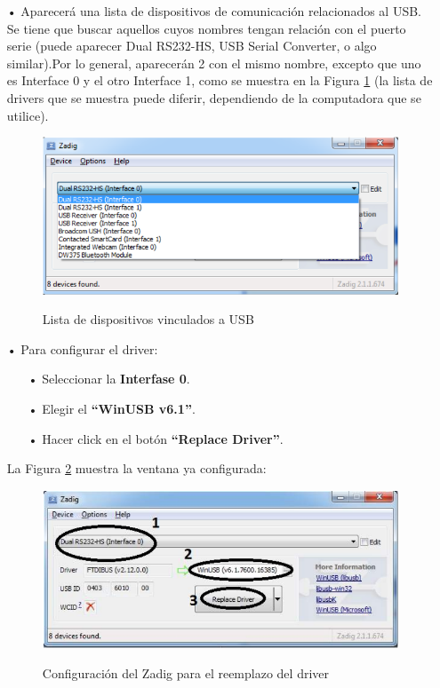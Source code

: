\documentclass[12pt,letterpaper]{article}
\begin{document}
\begin{enumerate}
\item[•]Aparecerá una lista de dispositivos de comunicación relacionados al USB. Se tiene que buscar aquellos cuyos nombres tengan relación con el puerto serie (puede aparecer Dual RS232-HS, USB Serial Converter, o algo similar).Por lo general, aparecerán 2 con el mismo nombre, excepto que uno es Interface 0 y el otro Interface 1, como se muestra en la Figura \ref{Fig16} (la lista de drivers que se muestra puede diferir, dependiendo de la computadora que se utilice).

\begin{figure}[!h]
\centering
\includegraphics[width=8 cm]{figuras/instalacion14.png}\\
\caption{Lista de dispositivos vinculados a USB}
\label{Fig16}
\end{figure}

\item[•]Para configurar el driver:

\begin{enumerate}
\item[•]Seleccionar la \textbf{Interfase 0}.
\item[•]Elegir el \textbf{“WinUSB v6.1”}.
\item[•]Hacer click en el botón \textbf{“Replace Driver”}.
\end{enumerate}
La Figura \ref{Fig17} muestra la ventana ya configurada:


\begin{figure}[!h]
\centering
\includegraphics[width=8 cm]{figuras/instalacion15.png}\\
\caption{Configuración del Zadig para el reemplazo del driver}
\label{Fig17}
\end{figure}

\end{enumerate}
\end{document}
